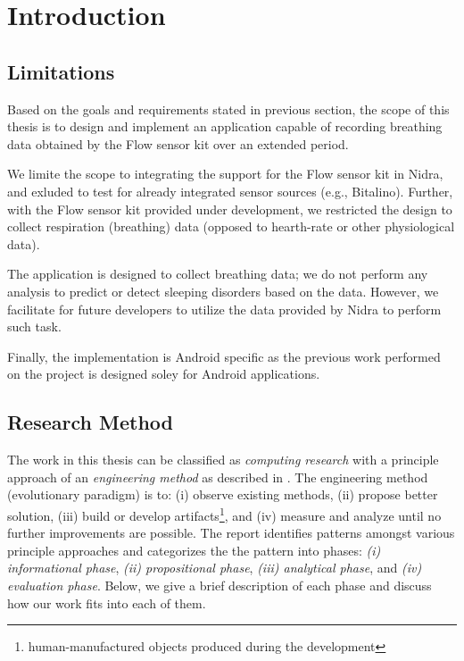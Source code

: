 \chapter{Introduction}\label{introduction}




\section{Limitations}
Based on the goals and requirements stated in previous section, the scope of this thesis is to design and implement an application capable of recording breathing data obtained by the Flow sensor kit over an extended period. 

We limite the scope to integrating the support for the Flow sensor kit in Nidra, and exluded to test for already integrated sensor sources (e.g., Bitalino). Further, with the Flow sensor kit provided under development, we restricted the design to collect respiration (breathing) data (opposed to hearth-rate or other physiological data).

The application is designed to collect breathing data; we do not perform any analysis to predict or detect sleeping disorders based on the data. However, we facilitate for future developers to utilize the data provided by Nidra to perform such task.

Finally, the implementation is Android specific as the previous work performed on the project is designed soley for Android applications. 

\section{Research Method}
The work in this thesis can be classified as \textit{computing research} with a principle approach of an \textit{engineering method} as described in \cite{Glass_1995}. The engineering method (evolutionary paradigm) is to: (i) observe existing methods, (ii) propose better solution, (iii)  build or develop artifacts\footnote{human-manufactured objects produced during the development}, and (iv) measure and analyze until no further improvements are possible. The report identifies patterns amongst various principle approaches and categorizes the the pattern into phases: \textit{(i) informational phase}, \textit{(ii) propositional phase}, \textit{(iii) analytical phase}, and \textit{(iv) evaluation phase}. Below, we give a brief description of each phase and discuss how our work fits into each of them. 


